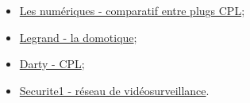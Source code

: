 \begin{itemize}
            \item \href{http://www.lesnumeriques.com/adaptateur-cpl/comparatif-adaptateurs-cpl-a296.html}{Les numériques - comparatif entre plugs CPL};
            \item \href{http://www.legrand.fr/professionnels/materiel-domotique_2555.html}{Legrand - la domotique};
            \item \href{http://www.darty.com/achat/comment/informatique/cpl/cpl.html}{Darty - CPL};
            \item \href{http://www.securite1.fr/content/25-fonctionnement-reseau-videosurveillance}{Securite1 - réseau de vidéosurveillance}.
        \end{itemize}

